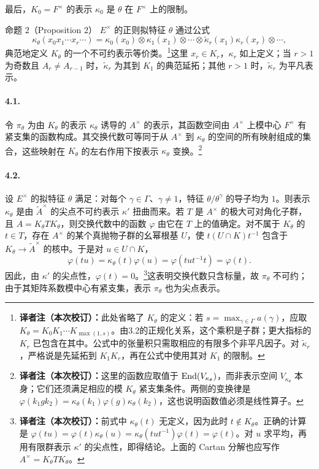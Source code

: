 最后，$K_0=F^\times$ 的表示 $\kappa_0$ 是 $\theta$ 在 $F^\times$ 上的限制。
\begin{originaltheorem}{命题 2（Proposition 2）}
$E^\times$ 的正则拟特征 $\theta$ 通过公式
\[
\kappa_\theta(x_0x_1\cdots x_r\cdots)=\kappa_0(x_0)\otimes\kappa_1(x_1)\otimes\cdots\otimes\widetilde\kappa_r(x_1)\kappa_r(x_r)\otimes\cdots,
\]
典范地定义 $K_\theta$ 的一个不可约表示等价类。\footnote{\textbf{译者注（本次校订）：}此处省略了 $K_\theta$ 的定义：若 $s=\max_{\gamma\in\Gamma}a(\gamma)$，应取 $K_\theta=K_0K_1\cdots K_{\max(1,s)}$。由3.2的正规化关系，这个乘积是子群；更大指标的 $K_r$ 已包含在其中。公式中的张量积只需取相应的有限多个非平凡因子。对 $\widetilde\kappa_r$，严格说是先延拓到 $K_1K_r$，再在公式中使用其对 $K_1$ 的限制。}这里 $x_r\in K_r$，$\kappa_r$ 如上定义；当 $r>1$ 为奇数且 $A_r\ne A_{r-1}$ 时，$\widetilde\kappa_r$ 为其到 $K_1$ 的典范延拓；其他 $r>1$ 时，$\widetilde\kappa_r$ 为平凡表示。
\end{originaltheorem}

\paragraph*{4.1.}令 $\pi_\theta$ 为由 $K_\theta$ 的表示 $\kappa_\theta$ 诱导的 $A^\times$ 的表示，其函数空间由 $A^\times$ 上模中心 $F^\times$ 有紧支集的函数构成。其交换代数可等同于从 $A^\times$ 到 $\kappa_\theta$ 的空间的所有映射组成的集合，这些映射在 $K_\theta$ 的左右作用下按表示 $\kappa_\theta$ 变换。\footnote{\textbf{译者注（本次校订）：}这里的函数应取值于 $\operatorname{End}(V_{\kappa_\theta})$，而非表示空间 $V_{\kappa_\theta}$ 本身；它们还须满足相应的模 $K_\theta$ 紧支集条件。两侧的变换律是 $\varphi(k_1gk_2)=\kappa_\theta(k_1)\varphi(g)\kappa_\theta(k_2)$，这也说明函数值必须是线性算子。}
\paragraph*{4.2.}设 $E^\times$ 的拟特征 $\theta$ 满足：对每个 $\gamma\in\Gamma$、$\gamma\ne1$，特征 $\theta/\theta^\gamma$ 的导子均为 $1$。则表示 $\kappa_\theta$ 是由 $\widetilde A^\times$ 的尖点不可约表示 $\kappa'$ 扭曲而来。若 $T$ 是 $A^\times$ 的极大可对角化子群，且 $A=K_\theta TK_\theta$，则交换代数中的函数 $\varphi$ 由它在 $T$ 上的值确定。对不属于 $K_\theta$ 的 $t\in T$，存在 $A^\times$ 的某个真抛物子群的幺幂根基 $U$，使 $t(U\cap K)t^{-1}$ 包含于 $K_\theta\to\widetilde A^\times$ 的核中。于是对 $u\in U\cap K$，
\[
\varphi(tu)=\kappa_\theta(t)\varphi(u)=\varphi(tut^{-1}t)=\varphi(t).
\]
因此，由 $\kappa'$ 的尖点性，$\varphi(t)=0$。\footnote{\textbf{译者注（本次校订）：}前式中 $\kappa_\theta(t)$ 无定义，因为此时 $t\notin K_\theta$。正确的计算是 $\varphi(tu)=\varphi(t)\kappa_\theta(u)=\kappa_\theta(tut^{-1})\varphi(t)=\varphi(t)$。对 $u$ 求平均，再用有限群表示 $\kappa'$ 的尖点性，即得结论。上面的 Cartan 分解也应写作 $A^\times=K_\theta TK_\theta$。}这表明交换代数只含标量，故 $\pi_\theta$ 不可约；由于其矩阵系数模中心有紧支集，表示 $\pi_\theta$ 也为尖点表示。
